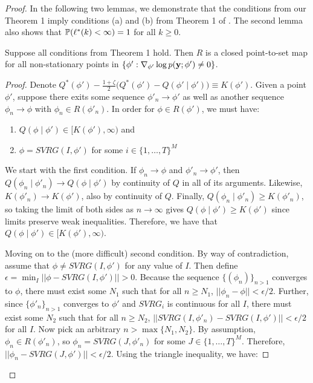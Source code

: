 \begin{proof}
In the following two lemmas, we demonstrate that the conditions from our Theorem 1 imply conditions (a) and (b) from Theorem 1 of \citet{Wu:1983}. The second lemma also shows that $\mathbb{P}(\ell^*(k) < \infty) = 1$ for all $k \geq 0$.

\begin{lemma}
    Suppose all conditions from Theorem 1 hold. Then $R$ is a closed point-to-set map for all non-stationary points in $\{\phi' : \nabla_{\phi'} \log p(\mathbf{y} ; \phi') \neq 0\}$.
\end{lemma}

\begin{proof}
     Denote $Q^*(\phi') - \frac{1 + \zeta}{2} \Big( Q^*(\phi') - Q(\phi' \mid \phi') \Big) \equiv K(\phi')$. Given a point $\phi'$, suppose there exits some sequence $\phi'_{n} \to \phi'$ as well as another sequence $\phi_{n} \to \phi$ with $\phi_{n} \in R(\phi'_{n})$. In order for $\phi \in R(\phi')$, we must have:
    \begin{enumerate}
        \item $Q(\phi \mid \phi') \in [K(\phi'),\infty)$ and
        \item $\phi = SVRG(I,\phi')$ for some $i \in \{1,\ldots,T\}^M$
    \end{enumerate}
    We start with the first condition. If $\phi_{n} \to \phi$ and $\phi'_{n} \to \phi'$, then $Q(\phi_{n} \mid \phi'_{n}) \to Q(\phi \mid \phi')$ by continuity of $Q$ in all of its arguments. Likewise, $K(\phi'_{n}) \to K(\phi')$, also by continuity of $Q$. Finally, $Q(\phi_{n} \mid \phi'_{n}) \geq K(\phi'_{n})$, so taking the limit of both sides as $n \to \infty$ gives $Q(\phi \mid \phi') \geq K(\phi')$ since limits preserve weak inequalities. Therefore, we have that $Q(\phi \mid \phi') \in [K(\phi'),\infty)$.
    
    Moving on to the (more difficult) second condition. By way of contradiction, assume that $\phi \neq SVRG(I,\phi')$ for any value of $I$. Then define $\epsilon = \min_I ||\phi - SVRG(I,\phi')|| > 0$. Because the sequence $\{(\phi_n)\}_{n>1}$ converges to $\phi$, there must exist some $N_1$ such that for all $n \geq N_1$, $||\phi_{n} - \phi|| < \epsilon/2$. Further, since $\{\phi'_{n}\}_{n>1}$ converges to $\phi'$ and $SVRG_i$ is continuous for all $I$, there must exist some $N_2$ such that for all $n \geq N_2$, $||SVRG(I,\phi'_{n}) - SVRG(I,\phi')|| < \epsilon/2$ for all $I$. Now pick an arbitrary $n > \max\{N_1,N_2\}$. By assumption, $\phi_{n} \in R(\phi'_{n})$, so $\phi_{n} = SVRG(J,\phi'_{n})$ for some $J \in \{1,\ldots,T\}^M$. Therefore, $||\phi_{n} - SVRG(J,\phi')|| < \epsilon/2$. Using the triangle inequality, we have:
    

\end{proof}
\end{proof}
